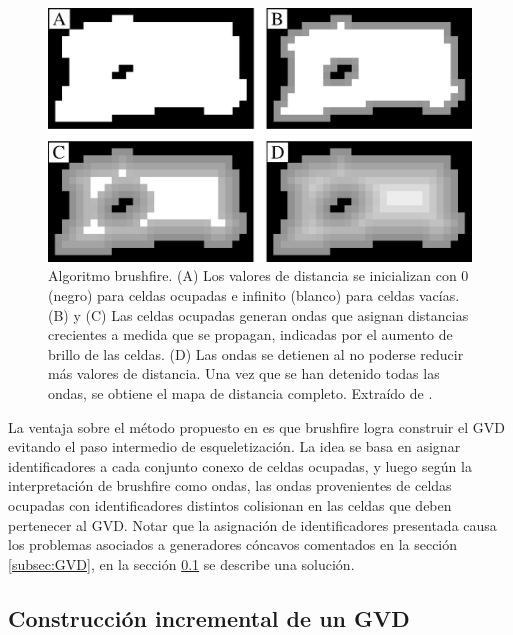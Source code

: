 \begin{figure}[H]
  \center
  \includegraphics[width=1\linewidth]{imagenes/wavesBrush2Rows.png}
  \caption[Algoritmo brushfire.]{Algoritmo brushfire. (A) Los valores de distancia se inicializan con 0 (negro) para celdas ocupadas e infinito (blanco) para celdas vacías. (B) y (C) Las celdas ocupadas generan ondas que asignan distancias crecientes a medida que se propagan, indicadas por el aumento de brillo de las celdas. (D) Las ondas se detienen al no poderse reducir más valores de distancia. Una vez que se han detenido todas las ondas, se obtiene el mapa de distancia completo. Extraído de \cite{Lau2013}.}\label{fig:wavesBrush}
\end{figure} 

La ventaja sobre el método propuesto en \cite{wurm2008coordinated} es
que brushfire logra construir el GVD evitando el paso intermedio de
esqueletización. La idea se basa en asignar identificadores a cada
conjunto conexo de celdas ocupadas, y luego según la interpretación de
brushfire como ondas, las ondas provenientes de celdas ocupadas con
identificadores distintos colisionan en las celdas que deben pertenecer
al GVD. Notar que la asignación de identificadores presentada causa los
problemas asociados a generadores cóncavos comentados en la sección
\ref{subsec:GVD}, en la sección \ref{subsec:constGVDInc} se describe una
solución. 

\subsection{Construcción incremental de un GVD}\label{subsec:constGVDInc}

